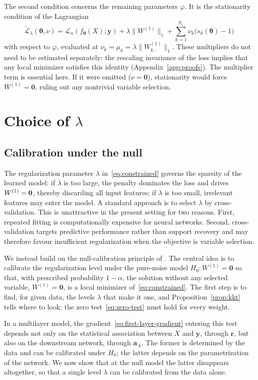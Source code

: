 \documentclass[twoside,11pt]{article}
\newcommand{\bth}{\boldsymbol{\theta}}
\newcommand{\ba}{\mathbf{a}}
\newcommand{\br}{\mathbf{r}}
\newcommand{\by}{\mathbf{y}}
\newcommand{\bzero}{\mathbf{0}}
\newcommand{\Wone}{W^{(1)}}
\newcommand{\PenWone}{\|W^{(1)}\|_1}
\newcommand{\PenWonek}{\|W^{(1)}_{k, \cdot}\|_1}
\newcommand{\Lt}{\tilde{\mathcal{L}}}
\begin{document}
The second condition concerns the remaining parameters $\varphi$. It is the stationarity condition of the Lagrangian
\begin{equation}\label{eq:lagrangian}
    \Lt_\lambda(\bth,\nu)
    =
    \mathcal{L}_n(f_{\bth}(X); \by)
    +\lambda\PenWone
    +\sum_{k=1}^{p_1}\nu_k\big(s_k(\bth)-1\big)
\end{equation}
with respect to $\varphi$, evaluated at
$\nu_k=\mu_k=\lambda\PenWonek$. These multipliers do not need to be estimated separately: the rescaling invariance of the loss implies that any local minimizer satisfies this identity
(Appendix~\ref{app:proofs}). The multiplier term is essential here. If it were omitted ($\nu=\bzero$), stationarity would force $\Wone=\bzero$, ruling out any nontrivial variable selection.

\section{Choice of $\lambda$}\label{sec:lambda-calibration}
\subsection{Calibration under the null}
The regularization parameter $\lambda$ in~\eqref{eq:constrained} governs the sparsity of the learned model: if $\lambda$ is too large, the penalty dominates the loss and drives $\Wone=\bf 0$, thereby discarding all input features; if $\lambda$ is too small, irrelevant features may enter the model. A standard approach is to select $\lambda$ by cross-validation. This is unattractive in the present setting for two reasons. First, repeated fitting is computationally expensive for neural networks. Second, cross-validation targets predictive performance rather than support recovery and may therefore favour insufficient regularization when the objective is variable selection.

We instead build on the null-calibration principle of \citet{PIC-SMS2026}. The central idea is to calibrate the regularization level under the pure-noise model $H_0:\Wone=\mathbf{0}$ so that, with prescribed probability $1-\alpha$, the solution without any selected variable, $\Wone=\mathbf{0}$, is a local minimizer of~\eqref{eq:constrained}. The first step is to find, for given data, the levels $\lambda$ that make it one, and Proposition~\ref{prop:kkt} tells where to look: the zero test~\eqref{eq:zero-test} must hold for every weight.

In a multilayer model, the gradient~\eqref{eq:first-layer-gradient} entering this test depends not only on the statistical association between $X$ and $\by$, through $\br$, but also on the downstream network, through $\ba_{\cdot k}$. The former is determined by the data and can be calibrated under $H_0$; the latter depends on the parametrization of the network. We now show that at the null model the latter disappears altogether, so that a single level $\lambda$ can be calibrated from the data alone.
\end{document}
